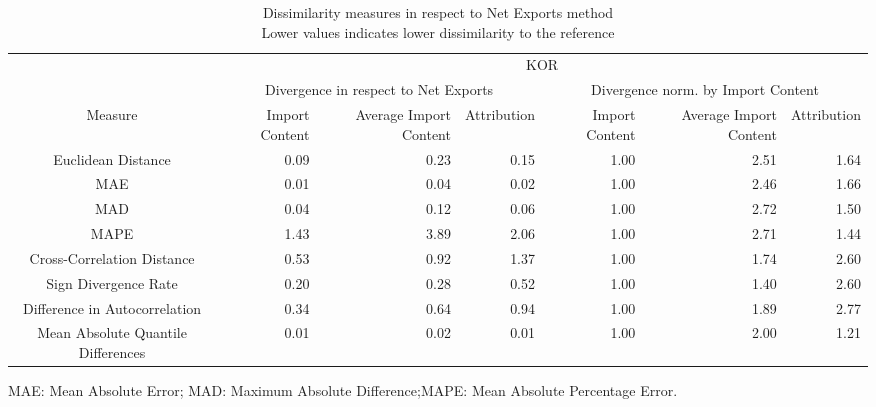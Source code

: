 \begin{table}[t]
\caption*{
{\large Dissimilarity measures in respect to Net Exports method} \\ 
{\small Lower values indicates lower dissimilarity to the reference}
} 
\fontsize{15.0pt}{18.0pt}\selectfont
\begin{tabular*}{\linewidth}{@{\extracolsep{\fill}}crrrrrr}
\toprule
 & \multicolumn{6}{c}{KOR} \\ 
\cmidrule(lr){2-7}
 & \multicolumn{3}{c}{Divergence in respect to Net Exports} & \multicolumn{3}{c}{Divergence norm. by Import Content} \\ 
\cmidrule(lr){2-4} \cmidrule(lr){5-7}
Measure & Import Content & Average Import Content & Attribution & Import Content & Average Import Content & Attribution \\ 
\midrule\addlinespace[2.5pt]
Euclidean Distance & 0.09 & 0.23 & 0.15 & 1.00 & 2.51 & 1.64 \\ 
MAE & 0.01 & 0.04 & 0.02 & 1.00 & 2.46 & 1.66 \\ 
MAD & 0.04 & 0.12 & 0.06 & 1.00 & 2.72 & 1.50 \\ 
MAPE & 1.43 & 3.89 & 2.06 & 1.00 & 2.71 & 1.44 \\ 
Cross-Correlation Distance & 0.53 & 0.92 & 1.37 & 1.00 & 1.74 & 2.60 \\ 
Sign Divergence Rate & 0.20 & 0.28 & 0.52 & 1.00 & 1.40 & 2.60 \\ 
Difference in Autocorrelation & 0.34 & 0.64 & 0.94 & 1.00 & 1.89 & 2.77 \\ 
Mean Absolute Quantile Differences & 0.01 & 0.02 & 0.01 & 1.00 & 2.00 & 1.21 \\ 
\bottomrule
\end{tabular*}
\begin{minipage}{\linewidth}
MAE: Mean Absolute Error; MAD: Maximum Absolute Difference;MAPE: Mean Absolute Percentage Error.\\
\end{minipage}
\end{table}

